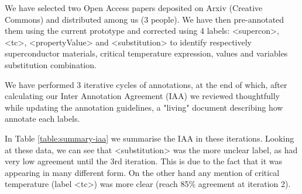 We have selected two Open Access papers deposited on Arxiv (Creative Commons) and distributed among us (3 people). We have then pre-annotated them using the current prototype and corrected using 4 labels: <supercon>, <tc>, <propertyValue> and <substitution> to identify respectively superconductor materials, critical temperature expression, values and variables substitution combination. 

We have performed 3 iterative cycles of annotations, at the end of which, after calculating our Inter Annotation Agreement (IAA) we reviewed thoughtfully while updating the annotation guidelines, a "living" document describing how annotate each labels.

In Table \ref{table:summary-iaa} we summarise the IAA in these iterations. Looking at these data, we can see that <substitution> was the more unclear label, as had very low agreement until the 3rd iteration. This is due to the fact that it was appearing in many different form. On the other hand any mention of critical temperature (label <tc>) was more clear (reach 85\% agreement at iteration 2). 


